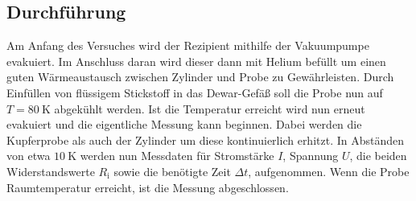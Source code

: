 \subsection{Durchführung}
Am Anfang des Versuches wird der Rezipient mithilfe der Vakuumpumpe evakuiert. Im Anschluss daran wird dieser dann mit Helium befüllt um einen guten Wärmeaustausch zwischen Zylinder und Probe zu
Gewährleisten. Durch Einfüllen von flüssigem Stickstoff in das Dewar-Gefäß soll die Probe nun auf $T=\SI{80}{\kelvin}$ abgekühlt werden. Ist die Temperatur erreicht wird nun erneut evakuiert und die
eigentliche Messung kann beginnen. Dabei werden die Kupferprobe als auch der Zylinder um diese kontinuierlich erhitzt. In Abständen von etwa $\SI{10}{\kelvin}$ werden nun Messdaten für
Stromstärke $I$, Spannung $U$, die beiden Widerstandswerte $R_\mathrm{i}$ sowie die benötigte Zeit $\Delta t$, aufgenommen. Wenn die Probe Raumtemperatur erreicht, ist die Messung abgeschlossen.
